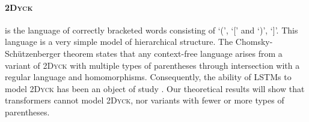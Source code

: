 \documentclass[11pt,a4paper]{article}
\newcounter{theorem}
\begin{document}




%
%


\paragraph{\textsc{2Dyck}} is the language of correctly bracketed words consisting of `(', `[' and `)', `]'.
This language is a very simple model of hierarchical structure.
The Chomsky-Sch{\"u}tzenberger theorem states that any context-free language arises from a variant of \textsc{2Dyck} with multiple types of parentheses through intersection with a regular language and homomorphisms.
Consequently, the ability of LSTMs to model \textsc{2Dyck} has been an object of study \cite{sennhauser2018evaluating,bernardy2018can}.
Our theoretical results will show that transformers cannot model \textsc{2Dyck}, nor variants with fewer or more types of parentheses.




\end{document}
